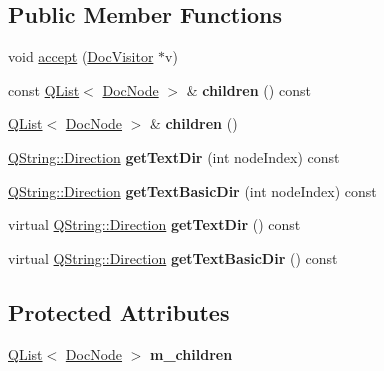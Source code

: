 \subsection*{Public Member Functions}
\begin{DoxyCompactItemize}
\item 
void \mbox{\hyperlink{class_comp_accept_a3f3a6b3476c5f0166163c4c5267c4ab0}{accept}} (\mbox{\hyperlink{class_doc_visitor}{Doc\+Visitor}} $\ast$v)
\item 
\mbox{\label{class_comp_accept_a1d55ee945808269d156f53a8ebe32806}} 
const \mbox{\hyperlink{class_q_list}{Q\+List}}$<$ \mbox{\hyperlink{class_doc_node}{Doc\+Node}} $>$ \& {\bfseries children} () const
\item 
\mbox{\label{class_comp_accept_af0bab1c89fc80848fe8be7b5c81afacb}} 
\mbox{\hyperlink{class_q_list}{Q\+List}}$<$ \mbox{\hyperlink{class_doc_node}{Doc\+Node}} $>$ \& {\bfseries children} ()
\item 
\mbox{\label{class_comp_accept_a6a70f12277dee9b9bcd40f809f2aa355}} 
\mbox{\hyperlink{class_q_string_acaff43b133319ea651f19aac6b967406}{Q\+String\+::\+Direction}} {\bfseries get\+Text\+Dir} (int node\+Index) const
\item 
\mbox{\label{class_comp_accept_a60a3aba9a23f85ba884b1962168cee58}} 
\mbox{\hyperlink{class_q_string_acaff43b133319ea651f19aac6b967406}{Q\+String\+::\+Direction}} {\bfseries get\+Text\+Basic\+Dir} (int node\+Index) const
\item 
\mbox{\label{class_comp_accept_a9ec67ea01d72bf2b3287953a6c7717b5}} 
virtual \mbox{\hyperlink{class_q_string_acaff43b133319ea651f19aac6b967406}{Q\+String\+::\+Direction}} {\bfseries get\+Text\+Dir} () const
\item 
\mbox{\label{class_comp_accept_a8c379cca5bcd23b4d39a489c608d0f41}} 
virtual \mbox{\hyperlink{class_q_string_acaff43b133319ea651f19aac6b967406}{Q\+String\+::\+Direction}} {\bfseries get\+Text\+Basic\+Dir} () const
\end{DoxyCompactItemize}
\subsection*{Protected Attributes}
\begin{DoxyCompactItemize}
\item 
\mbox{\label{class_comp_accept_af32d89695dc65d34b642dceb0da9e281}} 
\mbox{\hyperlink{class_q_list}{Q\+List}}$<$ \mbox{\hyperlink{class_doc_node}{Doc\+Node}} $>$ {\bfseries m\+\_\+children}
\end{DoxyCompactItemize}
